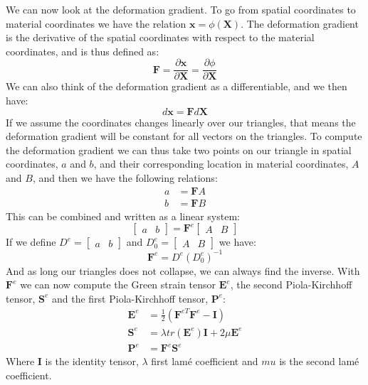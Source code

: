We can now look at the deformation gradient. To go from spatial coordinates to material coordinates we have the relation $\mathbf{x} = \phi(\mathbf{X})$. The deformation gradient is the derivative of the spatial coordinates with respect to the material coordinates, and is thus defined as:
\begin{equation*}
	\mathbf{F} = \frac{\partial \mathbf{x}}{\partial \mathbf{X}} = \frac{\partial \phi}{\partial \mathbf{X}}
\end{equation*}
We can also think of the deformation gradient as a differentiable, and we then have:
\begin{equation*}
	d\mathbf{x} = \mathbf{F}d\mathbf{X}
\end{equation*}
If we assume the coordinates changes linearly over our triangles, that means the deformation gradient will be constant for all vectors on the triangles. To compute the deformation gradient we can thus take two points on our triangle in spatial coordinates, $a$ and $b$, and their corresponding location in material coordinates, $A$ and $B$, and then we have the following relations:
\begin{align*}
	a &= \mathbf{F}A\\
	b &= \mathbf{F}B
\end{align*} 
This can be combined and written as a linear system:
\begin{equation*}
	\begin{bmatrix}
		a & b
	\end{bmatrix} = \mathbf{F}^e \begin{bmatrix}
	A & B
\end{bmatrix}
\end{equation*}
If we define $D^e = \begin{bmatrix} a & b \end{bmatrix}$ and $D^e_0 = \begin{bmatrix} A & B \end{bmatrix}$ we have:
\begin{equation*}
	\mathbf{F}^e = D^e(D^e_0)^{-1}
\end{equation*}
And as long our triangles does not collapse, we can always find the inverse. With $\mathbf{F}^e$ we can now compute the Green strain tensor $\mathbf{E}^e$, the second Piola-Kirchhoff tensor, $\mathbf{S}^e$ and the first Piola-Kirchhoff tensor, $\mathbf{P}^e$:
\begin{align*}
	\mathbf{E}^e &= \frac{1}{2}\left(\mathbf{F}^{eT}\mathbf{F}^e-\mathbf{I}\right)\\
	\mathbf{S}^e &= \lambda tr\left(\mathbf{E}^e\right)\mathbf{I} + 2\mu \mathbf{E}^e\\
	\mathbf{P}^e &= \mathbf{F}^e\mathbf{S}^e
\end{align*}
Where $\mathbf{I}$ is the identity tensor, $\lambda$ first lamé coefficient and $mu$ is the second lamé coefficient.

